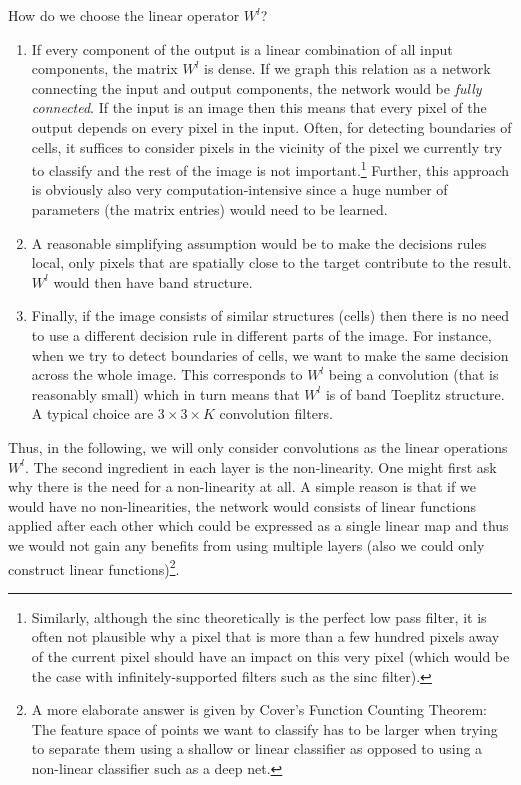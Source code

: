 How do we choose the linear operator $W^l$?
\begin{enumerate}
\item If every component of the output is a linear combination of all input
  components, the matrix $W^l$ is dense. If we graph this relation as a network
  connecting the input and output components, the network would be \emph{fully
    connected}. If the input is an image then this means that every pixel of the
  output depends on every pixel in the input. Often, \eg for detecting
  boundaries of cells, it suffices to consider pixels in the vicinity of the
  pixel we currently try to classify and the rest of the image is not
  important.\footnote{Similarly, although the sinc theoretically is the perfect
    low pass filter, it is often not plausible why a pixel that is more than a
    few hundred pixels away of the current pixel should have an impact on this
    very pixel (which would be the case with infinitely-supported filters such
    as the sinc filter).}  Further, this approach is obviously also very
  computation-intensive since a huge number of parameters (the matrix entries)
  would need to be learned.
\item A reasonable simplifying assumption would be to make the decisions rules
  local, \ie only pixels that are spatially close to the target contribute to
  the result. $W^l$ would then have band structure.
\item Finally, if the image consists of similar structures (\eg cells) then
  there is no need to use a different decision rule in different parts of the
  image. For instance, when we try to detect boundaries of cells, we want to
  make the same decision across the whole image. This corresponds to $W^l$ being
  a convolution (that is reasonably small) which in turn means that $W^l$ is of
  band Toeplitz structure. A typical choice are $3 \times 3 \times K$
  convolution filters.
\end{enumerate}
Thus, in the following, we will only consider convolutions as the linear
operations $W^l$. The second ingredient in each layer is the non-linearity.  One
might first ask why there is the need for a non-linearity at all. A simple
reason is that if we would have no non-linearities, the network would consists
of linear functions applied after each other which could be expressed as a
single linear map and thus we would not gain any benefits from using multiple
layers (also we could only construct linear functions)\footnote{A more elaborate
  answer is given by Cover's Function Counting Theorem: The feature space of
  points we want to classify has to be larger when trying to separate them using
  a shallow or linear classifier as opposed to using a non-linear classifier
  such as a deep net.}.

